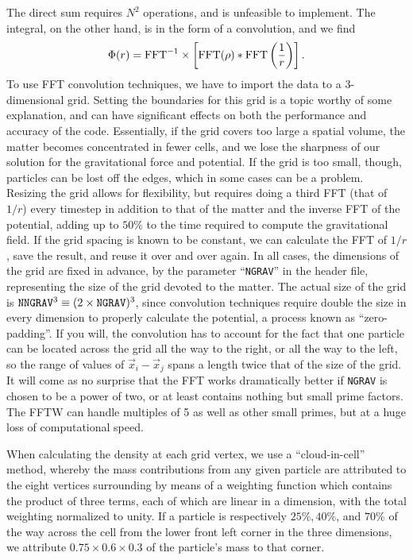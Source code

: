 The direct sum requires $N^2$ operations, and is unfeasible to
implement.  The integral, on the other hand, is in the form of a
convolution, and we find 
\begin{equation}
\Phi(r)={\rm FFT}^{-1}\times 
\left[{\rm FFT}(\rho)*{\rm FFT}\left(\frac{1}{r}\right)\right].
\end{equation}
To use FFT convolution techniques, we have to import the data to a
3-dimensional grid.  Setting the boundaries for this grid is a topic
worthy of some explanation, and can have significant effects on both
the performance and accuracy of the code.  Essentially, if the grid
covers too large a spatial volume, the matter becomes concentrated in
fewer cells, and we lose the sharpness of our solution for the
gravitational force and potential.  If the grid is too small, though,
particles can be lost off the edges, which in some cases can be a
problem.  Resizing the grid allows for flexibility, but requires doing
a third FFT (that of $1/r$) every timestep in addition to that of the
matter and the inverse FFT of the potential, adding up to $50\%$ to
the time required to compute the gravitational field.  If the grid
spacing is known to be constant, we can calculate the FFT of $1/r$,
save the result, and reuse it over and over again.
In all cases, the dimensions of the grid are fixed in advance, by the
parameter ``{\tt NGRAV}'' in the header file, representing the size of
the grid devoted to the matter.  The actual size of the
grid is ${\tt NNGRAV}^3\equiv (2 \times{\tt NGRAV})^3$, since convolution
techniques require double the size in every dimension to properly
calculate the potential, a process known as ``zero-padding''.  
If you will, the convolution has to account
for the fact that one particle can be located across the grid all the
way to the right, or all the way to the left, so the range of values
of $\vec{x}_i-\vec{x}_j$ spans a length twice that of the size of the grid.  It
will come as no surprise that the FFT works dramatically better if
{\tt NGRAV} is chosen to be a power of two, or at least contains
nothing but small prime factors.  The FFTW can handle multiples of 5
as well as other small primes, but at a huge loss of computational speed.

When calculating the density at each grid vertex, we use a
``cloud-in-cell'' method, whereby the mass contributions from any
given particle are attributed to the eight vertices surrounding by means
of a weighting function which contains the product of three terms,
each of which are linear in a dimension, with the total weighting
normalized to unity.  If a particle is respectively $25\%, 40\%$, and
$70\%$ of the way across the cell from the lower front left corner in
the three dimensions, we attribute $0.75\times 0.6\times 0.3$ of the
particle's mass to that corner. 

